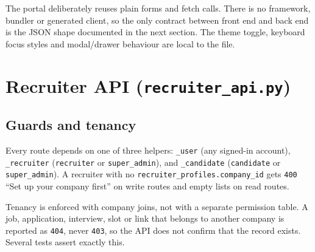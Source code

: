 \documentclass[11pt,a4paper]{article}
\newcommand{\file}[1]{\texttt{\small #1}}
\newcommand{\code}[1]{\texttt{#1}}
\begin{document}
The portal deliberately reuses plain forms and fetch calls. There is no
framework, bundler or generated client, so the only contract between front end
and back end is the JSON shape documented in the next section. The theme
toggle, keyboard focus styles and modal/drawer behaviour are local to the
file.

\section{Recruiter API (\file{recruiter\_api.py})}
\label{u:rec-api}

\subsection{Guards and tenancy}
Every route depends on one of three helpers:
\code{\_user} (any signed-in account), \code{\_recruiter}
(\code{recruiter} or \code{super\_admin}), and \code{\_candidate}
(\code{candidate} or \code{super\_admin}). A recruiter with no
\code{recruiter\_profiles.company\_id} gets \code{400}
``Set up your company first'' on write routes and empty lists on read routes.

Tenancy is enforced with company joins, not with a separate permission table.
A job, application, interview, slot or link that belongs to another company is
reported as \code{404}, never \code{403}, so the API does not confirm that the
record exists. Several tests assert exactly this.
\end{document}
